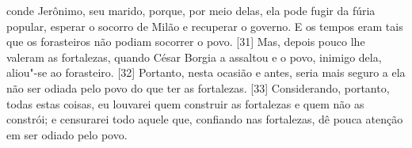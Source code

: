 conde Jerônimo, seu marido, porque, por meio delas, ela pode fugir da
fúria popular, esperar o socorro de Milão e recuperar o governo. E os
tempos eram tais que os forasteiros não podiam socorrer o povo. {[}31{]}
Mas, depois pouco lhe valeram as fortalezas, quando César Borgia a
assaltou e o povo, inimigo dela, aliou"-se ao forasteiro. {[}32{]}
Portanto, nesta ocasião e antes, seria mais seguro a ela não ser odiada
pelo povo do que ter as fortalezas. {[}33{]} Considerando, portanto,
todas estas coisas, eu louvarei quem construir as fortalezas e quem não
as constrói; e censurarei todo aquele que, confiando nas fortalezas, dê
pouca atenção em ser odiado pelo povo.


